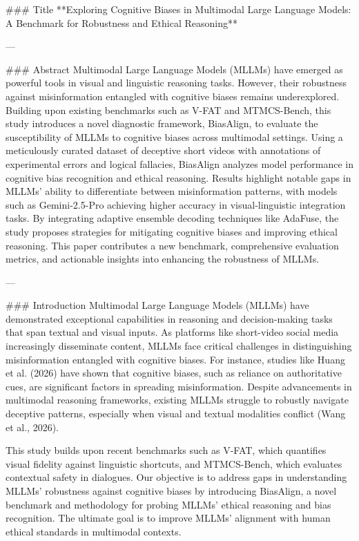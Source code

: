 ### Title  
**Exploring Cognitive Biases in Multimodal Large Language Models: A Benchmark for Robustness and Ethical Reasoning**

---

### Abstract  
Multimodal Large Language Models (MLLMs) have emerged as powerful tools in visual and linguistic reasoning tasks. However, their robustness against misinformation entangled with cognitive biases remains underexplored. Building upon existing benchmarks such as V-FAT and MTMCS-Bench, this study introduces a novel diagnostic framework, BiasAlign, to evaluate the susceptibility of MLLMs to cognitive biases across multimodal settings. Using a meticulously curated dataset of deceptive short videos with annotations of experimental errors and logical fallacies, BiasAlign analyzes model performance in cognitive bias recognition and ethical reasoning. Results highlight notable gaps in MLLMs' ability to differentiate between misinformation patterns, with models such as Gemini-2.5-Pro achieving higher accuracy in visual-linguistic integration tasks. By integrating adaptive ensemble decoding techniques like AdaFuse, the study proposes strategies for mitigating cognitive biases and improving ethical reasoning. This paper contributes a new benchmark, comprehensive evaluation metrics, and actionable insights into enhancing the robustness of MLLMs.

---

### Introduction  
Multimodal Large Language Models (MLLMs) have demonstrated exceptional capabilities in reasoning and decision-making tasks that span textual and visual inputs. As platforms like short-video social media increasingly disseminate content, MLLMs face critical challenges in distinguishing misinformation entangled with cognitive biases. For instance, studies like Huang et al. (2026) have shown that cognitive biases, such as reliance on authoritative cues, are significant factors in spreading misinformation. Despite advancements in multimodal reasoning frameworks, existing MLLMs struggle to robustly navigate deceptive patterns, especially when visual and textual modalities conflict (Wang et al., 2026).

This study builds upon recent benchmarks such as V-FAT, which quantifies visual fidelity against linguistic shortcuts, and MTMCS-Bench, which evaluates contextual safety in dialogues. Our objective is to address gaps in understanding MLLMs' robustness against cognitive biases by introducing BiasAlign, a novel benchmark and methodology for probing MLLMs' ethical reasoning and bias recognition. The ultimate goal is to improve MLLMs' alignment with human ethical standards in multimodal contexts.

